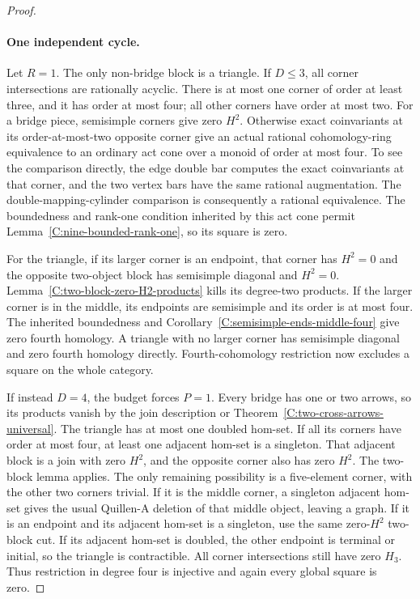 \begin{proof}
\paragraph{One independent cycle.}
Let $R=1$.  The only non-bridge block is a triangle.
If $D\leq3$, all corner intersections are rationally
acyclic.  There is at most one corner of order at least
three, and it has order at most four; all other corners
have order at most two.
For a bridge piece, semisimple corners give zero $H^2$.
Otherwise exact coinvariants at its order-at-most-two
opposite corner give an actual rational cohomology-ring
equivalence to an ordinary act cone over a monoid of
order at most four.  To see the comparison directly,
the edge double bar computes the exact coinvariants
at that corner, and the two vertex bars have the same
rational augmentation.  The double-mapping-cylinder
comparison is consequently a rational equivalence.
The boundedness and rank-one condition inherited by
this act cone permit Lemma~\ref{C:nine-bounded-rank-one},
so its square is zero.

For the triangle, if its larger corner is an endpoint,
that corner has $H^2=0$ and the opposite two-object
block has semisimple diagonal and $H^2=0$.
Lemma~\ref{C:two-block-zero-H2-products} kills its
degree-two products.  If the larger corner is in the
middle, its endpoints are semisimple and its order is
at most four.  The inherited boundedness and
Corollary~\ref{C:semisimple-ends-middle-four} give
zero fourth homology.  A triangle with no larger corner
has semisimple diagonal and zero fourth homology directly.
Fourth-cohomology restriction now excludes a square
on the whole category.

If instead $D=4$, the budget forces $P=1$.  Every bridge
has one or two arrows, so its products vanish by the
join description or Theorem~\ref{C:two-cross-arrows-universal}.
The triangle has at most one doubled hom-set.  If all
its corners have order at most four, at least one
adjacent hom-set is a singleton.  That adjacent block
is a join with zero $H^2$, and the opposite corner
also has zero $H^2$.  The two-block lemma applies.
The only remaining possibility is a five-element corner,
with the other two corners trivial.  If it is the middle
corner, a singleton adjacent hom-set gives the usual
Quillen-A deletion of that middle object, leaving a
graph.  If it is an endpoint and its adjacent hom-set
is a singleton, use the same zero-$H^2$ two-block cut.
If its adjacent hom-set is doubled, the other endpoint
is terminal or initial, so the triangle is contractible.
All corner intersections still have zero $H_3$.
Thus restriction in degree four is injective and again
every global square is zero.


\end{proof}
